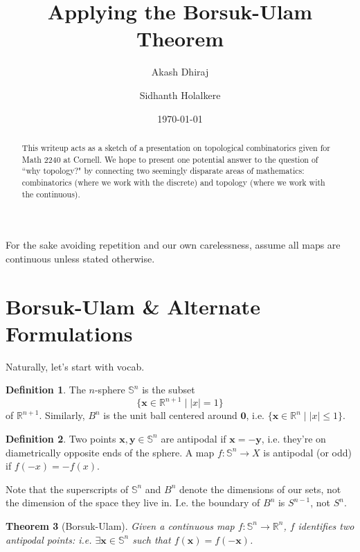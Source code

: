 \documentclass[12pt]{amsart}
\newtheorem{thm}{Theorem}[section]
\theoremstyle{definition}
\newtheorem{dfn}[thm]{Definition}
\begin{document}
    \title{Applying the Borsuk-Ulam Theorem}
    \author{Akash Dhiraj}
    \author{Sidhanth Holalkere}
    \date{\today}

    \begin{abstract}
        This writeup acts as a sketch of a presentation on topological combinatorics given for Math 2240 at Cornell. We hope to present one potential answer to the question of ``why topology?" by connecting two seemingly disparate areas of mathematics: combinatorics (where we work with the discrete) and topology (where we work with the continuous).
    \end{abstract}

    \maketitle

    For the sake avoiding repetition and our own carelessness, assume all maps are continuous unless stated otherwise.

    \section{Borsuk-Ulam \& Alternate Formulations}

    Naturally, let's start with vocab.

    \begin{dfn}
    The $n$-sphere $\mathbb S^n$ is the subset $$\{\mathbf x \in \mathbb R^{n+1} \mid |x| = 1\}$$ of $\mathbb R^{n+1}$. Similarly, $B^n$ is the unit ball centered around $\mathbf 0$, i.e. $\{\mathbf x \in \mathbb R^n \mid |x| \leq 1\}$.
    \end{dfn}

    \begin{dfn}
        Two points $\mathbf x, \mathbf y \in \mathbb S^n$ are antipodal if $\mathbf x = -\mathbf y$, i.e. they're on diametrically opposite ends of the sphere. A map $f: \mathbb S^n \to X$ is antipodal (or odd) if $f(-x) = -f(x)$.
    \end{dfn}

    Note that the superscripts of $\mathbb S^n$ and $B^n$ denote the dimensions of our sets, not the dimension of the space they live in. I.e. the boundary of $B^n$ is $S^{n-1}$, not $S^n$.

    \begin{thm}[Borsuk-Ulam]
        \label{main}
        Given a continuous map $f: \mathbb S^n \to \mathbb R^n$, $f$ identifies two antipodal points: i.e. $\exists \mathbf x \in \mathbb S^n$ such that $f(\mathbf x) = f(-\mathbf x)$.
    \end{thm}
\end{document}
